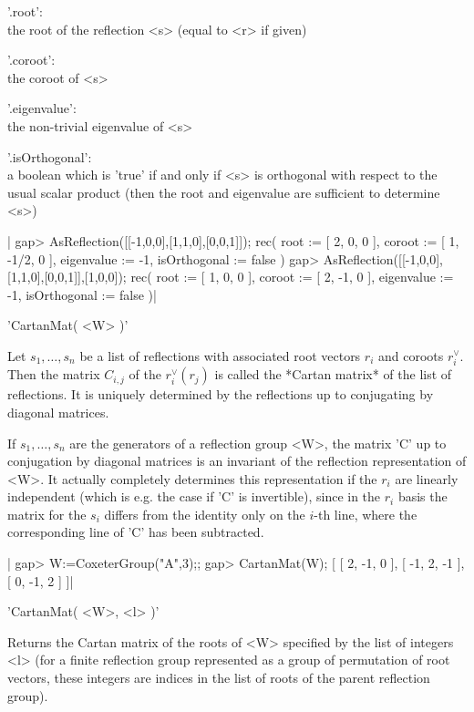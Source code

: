 '.root':   \\ the root of the reflection <s> (equal to <r> if given)

'.coroot': \\ the coroot of <s>

'.eigenvalue': \\ the non-trivial eigenvalue of <s>

'.isOrthogonal':  \\ a  boolean  which is  'true' if  and  only if  <s> is
  orthogonal  with respect to  the usual scalar  product (then the root and
  eigenvalue are sufficient to determine <s>)

|    gap> AsReflection([[-1,0,0],[1,1,0],[0,0,1]]);
    rec(
      root := [ 2, 0, 0 ],
      coroot := [ 1, -1/2, 0 ],
      eigenvalue := -1,
      isOrthogonal := false )
    gap> AsReflection([[-1,0,0],[1,1,0],[0,0,1]],[1,0,0]);
    rec(
      root := [ 1, 0, 0 ],
      coroot := [ 2, -1, 0 ],
      eigenvalue := -1,
      isOrthogonal := false )|


'CartanMat( <W> )'

Let  $s_1,\ldots,s_n$ be a list of reflections with associated root vectors
$r_i$   and  coroots   $r_i^\vee$.  Then   the  matrix   $C_{i,j}$  of  the
$r_i^\vee(r_j)$  is called the *Cartan matrix*  of the list of reflections.
It  is uniquely determined by the reflections up to conjugating by diagonal
matrices.

If  $s_1,\ldots,s_n$  are  the  generators  of  a reflection group <W>, the
matrix  'C' up to conjugation  by diagonal matrices is  an invariant of the
reflection  representation of  <W>. It  actually completely determines this
representation  if the  $r_i$ are  linearly independent  (which is e.g. the
case  if 'C' is  invertible), since in  the $r_i$ basis  the matrix for the
$s_i$  differs  from  the  identity  only  on  the  $i$-th  line, where the
corresponding line of 'C' has been subtracted.

|    gap> W:=CoxeterGroup("A",3);;
    gap> CartanMat(W);
    [ [ 2, -1, 0 ], [ -1, 2, -1 ], [ 0, -1, 2 ] ]|

'CartanMat( <W>, <l> )'

Returns  the Cartan  matrix of  the roots  of <W>  specified by the list of
integers  <l>  (for  a  finite  reflection  group represented as a group of
permutation  of root  vectors, these  integers are  indices in  the list of
roots of the parent reflection group).

